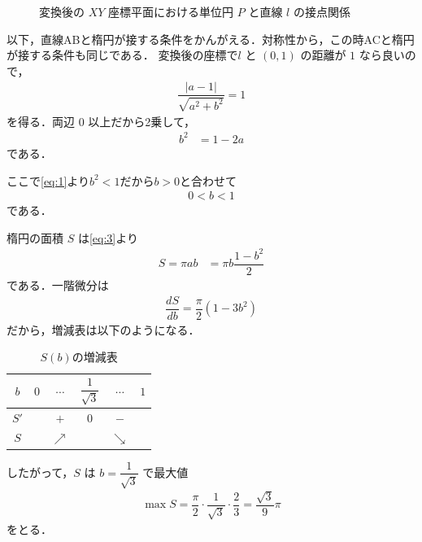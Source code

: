 \documentclass[../../main.tex]{subfiles}
\begin{document}
\begin{figure}[htb]
  \caption{変換後の $XY$ 座標平面における単位円 $P$ と直線 $l$ の接点関係}
  \label{fig:transformed_circle_line_XY}
\end{figure}

以下，直線ABと楕円が接する条件をかんがえる．対称性から，この時ACと楕円が接する条件も同じである．
変換後の座標で$l$ と $(0,1)$ の距離が $1$ なら良いので，
\begin{align}
  \dfrac{|a-1|}{\sqrt{a^2+b^2}} = 1
\end{align}
を得る．両辺 $0$ 以上だから2乗して，
\begin{align}
  b^2 &= 1 - 2a \label{eq:2}
\end{align}
である．

ここで\cref{eq:1}より$b^2<1$だから$b>0$と合わせて
\begin{align}
  0<b<1 \label{eq:3}
\end{align}
である．

楕円の面積 $S$ は\cref{eq:3}より
\begin{align}
  S = \pi a b &= \pi b \dfrac{1-b^2}{2}
\end{align}
である．一階微分は
\begin{align}
  \dfrac{dS}{db} = \dfrac{\pi}{2}\left(1-3b^2\right)
\end{align}
だから，増減表は以下のようになる．

\begin{table}[htb]
  \centering
  \caption{$S(b)$の増減表}
  \begin{tabular}{|c|c|c|c|c|c|}
    \hline
    $b$ & $0$ & $\cdots$ & $\dfrac{1}{\sqrt{3}}$ & $\cdots$ & $1$ \\
    \hline
    $S'$ & & $+$ & $0$ & $-$ & \\
    \hline
    $S$ & & $\nearrow$ & & $\searrow$ & \\
    \hline
  \end{tabular}
\end{table}

したがって，$S$ は $b = \dfrac{1}{\sqrt{3}}$ で最大値
\begin{align}
  \max S = \dfrac{\pi}{2} \cdot \dfrac{1}{\sqrt{3}} \cdot \dfrac{2}{3} = \dfrac{\sqrt{3}}{9}\pi
\end{align}
をとる．
\end{document}
